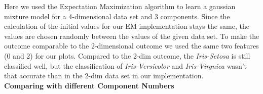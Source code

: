 \documentclass[a4paper]{article}
\begin{document}
\noindent
Here we used the Expectation Maximization algorithm to learn a gaussian mixture model for a 4-dimensional data set and 3 components. Since the calculation of the initial values for our EM implementation stays the same, the values are chosen randomly between the values of the given data set. To make the outcome comparable to the 2-dimensional outcome we used the same two features (0 and 2) for our plots. Compared to the 2-dim outcome, the \textit{Iris-Setosa} is still classified well, but the classification of \textit{Iris-Versicolor} and \textit{Iris-Virgnica} wasn't that accurate than in the 2-dim data set in our implementation. \\
\newpage
\noindent
{\large \textbf{Comparing with different Component Numbers}} \\

\end{document}
